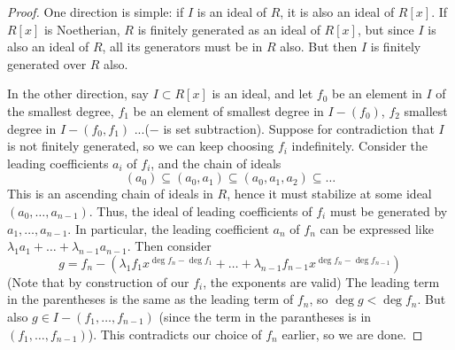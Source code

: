 \documentclass[12pt]{article}
\begin{document}
    \begin{proof}
        One direction is simple: if $I$ is an ideal of $R$, it is also an ideal of $R[x]$. If $R[x]$ is Noetherian, $R$ is finitely generated as an ideal of $R[x]$, but since $I$ is also an ideal of $R$, all its generators must be in $R$ also. But then $I$ is finitely generated over $R$ also. \par
        In the other direction, say $I \subset R[x]$ is an ideal, and let $f_0$ be an element in $I$ of the smallest degree, $f_1$ be an element of smallest degree in $I - (f_0)$, $f_2$ smallest degree in $I - (f_0, f_1)$ ...($-$ is set subtraction). Suppose for contradiction that $I$ is not finitely generated, so we can keep choosing $f_i$ indefinitely. Consider the leading coefficients $a_i$ of $f_i$, and the chain of ideals
        $$(a_0) \subseteq (a_0, a_1) \subseteq (a_0, a_1, a_2) \subseteq \dots$$
        This is an ascending chain of ideals in $R$, hence it must stabilize at some ideal $(a_0, \dots, a_{n-1})$. Thus, the ideal of leading coefficients of $f_i$ must be generated by $a_1, \dots, a_{n-1}$. In particular, the leading coefficient $a_{n}$ of $f_{n}$ can be expressed like $\lambda_1 a_1 + \dots + \lambda_{n-1} a_{n-1}$.
        Then consider
        $$g = f_{n} - (\lambda_1 f_1 x^{\deg f_{n} - \deg f_1} + \dots + \lambda_{n-1} f_{n-1} x^{\deg f_{n} - \deg f_{n-1}})$$
        (Note that by construction of our $f_i$, the exponents are valid) The leading term in the parentheses is the same as the leading term of $f_{n}$, so $\deg g < \deg f_{n}$. But also $g \in I - (f_1, \dots, f_{n-1})$ (since the term in the parantheses is in $(f_1, \dots, f_{n-1})$). This contradicts our choice of $f_n$ earlier, so we are done.
    \end{proof}
\end{document}
